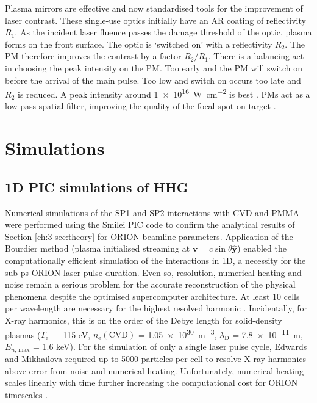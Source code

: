 Plasma mirrors are effective and now standardised tools for the improvement of laser contrast. These single-use optics initially have an \ac{AR} coating of reflectivity $R_1$. As the incident laser fluence passes the damage threshold of the optic, plasma forms on the front surface. The optic is `switched on' with a reflectivity $R_2$. The \ac{PM} therefore improves the contrast by a factor $R_2/R_1$. There is a balancing act in choosing the peak intensity on the \ac{PM}. Too early and the PM will switch on before the arrival of the main pulse. Too low and switch on occurs too late and $R_2$ is reduced. A peak intensity around \qty{1e16}{W.cm^{-2}} is best \cite{caiTimeresolvedMeasurementsReflectivity2009}. PMs act as a low-pass spatial filter, improving the quality of the focal spot on target \cite{doumyCompleteCharacterizationPlasma2004}. 

\section{\label{ch:3-sec:simulations}Simulations}
\subsection{1D PIC simulations of HHG}
Numerical simulations of the SP1 and SP2 interactions with CVD and PMMA were performed using the Smilei PIC code to confirm the analytical results of Section \ref{ch:3-sec:theory} for ORION beamline parameters. Application of the Bourdier method (plasma initialised streaming at $\mathbf{v}= c\sin\theta \mathbf{\hat{y}}$) enabled the computationally efficient simulation of the interactions in 1D, a necessity for the sub-ps ORION laser pulse duration. Even so, resolution, numerical heating and noise remain a serious problem for the accurate reconstruction of the physical phenomena despite the optimised supercomputer architecture. At least 10 cells per wavelength are necessary for the highest resolved harmonic \cite{edwardsXRayEmissionEffectiveness2020}. Incidentally, for X-ray harmonics, this is on the order of the Debye length for solid-density plasmas ($T_\mathrm{e} = $ 115 eV, $n_\mathrm{e}(\mathrm{CVD})$ = \qty{1.05e30}{m^{-3}}, $\lambda_\mathrm{D}$ = \qty{7.8e-11}{m}, $E_{n,\, \mathrm{max}}$ = 1.6 keV). For the simulation of only a single laser pulse cycle, Edwards and Mikhailova required up to 5000 particles per cell \cite{edwardsXRayEmissionEffectiveness2020} to resolve X-ray harmonics above error from noise and numerical heating. Unfortunately, numerical heating scales linearly with time further increasing the computational cost for ORION timescales \cite{arberContemporaryParticleincellApproach2015}.

